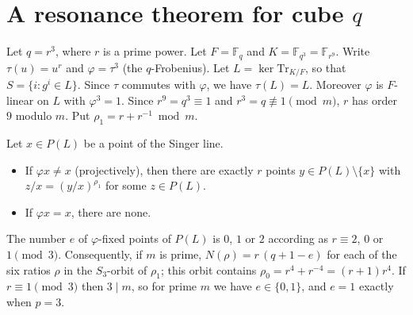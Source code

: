 \section{A resonance theorem for cube $q$}\label{sec:res}
Let $q=r^3$, where $r$ is a prime power. Let $F=\mathbb F_q$ and $K=\mathbb F_{q^3}=\mathbb F_{r^9}$. Write $\tau(u)=u^r$ and $\varphi=\tau^3$ (the $q$-Frobenius).
Let $L=\ker\mathrm{Tr}_{K/F}$, so that $S=\{i: g^i\in L\}$. Since $\tau$ commutes with $\varphi$, we have $\tau(L)=L$. Moreover $\varphi$ is $F$-linear on $L$ with $\varphi^3=1$.
Since $r^9=q^3\equiv1$ and $r^3=q\not\equiv1\pmod m$, $r$ has order $9$ modulo $m$. Put $\rho_1=r+r^{-1}\bmod m$.
\begin{theorem}\label{thm:res}
Let $x\in P(L)$ be a point of the Singer line.
\begin{itemize}
\item If $\varphi x\ne x$ (projectively), then there are exactly $r$ points $y\in P(L)\setminus\{x\}$ with $z/x=(y/x)^{\rho_1}$ for some $z\in P(L)$.
\item If $\varphi x=x$, there are none.
\end{itemize}
The number $e$ of $\varphi$-fixed points of $P(L)$ is $0$, $1$ or $2$ according as $r\equiv2$, $0$ or $1\pmod3$.
Consequently, if $m$ is prime, $N(\rho)=r\,(q+1-e)$ for each of the six ratios $\rho$ in the $S_3$-orbit of $\rho_1$; this orbit contains $\rho_0=r^4+r^{-4}=(r+1)r^4$.
If $r\equiv1\pmod3$ then $3\mid m$, so for prime $m$ we have $e\in\{0,1\}$, and $e=1$ exactly when $p=3$.
\end{theorem}
